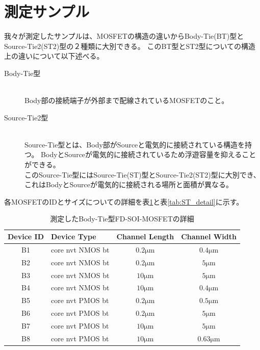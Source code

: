 	\section{測定サンプル}
		我々が測定したサンプルは、MOSFETの構造の違いからBody-Tie(BT)型とSource-Tie2(ST2)型の２種類に大別できる。
		このBT型とST2型についての構造上の違いについて以下述べる。
		\begin{description}
			\item[Body-Tie型]\mbox{}\\
				Body部の接続端子が外部まで配線されているMOSFETのこと。
			\item[Source-Tie2型]\mbox{}\\
				Source-Tie型とは、Body部がSourceと電気的に接続されている構造を持つ。
				BodyとSourceが電気的に接続されているため浮遊容量を抑えることができる。\\
				このSource-Tie型にはSource-Tie(ST)型とSource-Tie2(ST2)型に大別でき、これはBodyとSourceが電気的に接続される場所と面積が異なる。
		\end{description}
		各MOSFETのIDとサイズについての詳細を表\ref{tab:BT_detail}と表\ref{tab:ST_detail}に示す。
		\begin{table}[htb]
			\begin{center}
				\begin{tabular}{| c | l | c | c |} \hline
					Device ID & Device Type & Channel Length & Channel Width \\ \hline \hline
					B1 & core nvt NMOS bt & $0.2 \mathrm{\mu m}$ & $0.4 \mathrm{\mu m}$ \\ \hline
					B2 & core nvt NMOS bt & $0.2 \mathrm{\mu m}$ & $5 \mathrm{\mu m}$ \\ \hline
					B3 & core nvt NMOS bt & $10 \mathrm{\mu m}$ & $5 \mathrm{\mu m}$ \\ \hline
					B4 & core nvt NMOS bt & $10 \mathrm{\mu m}$ & $0.4 \mathrm{\mu m}$ \\ \hline \hline
					B5 & core nvt PMOS bt & $0.2 \mathrm{\mu m}$ & $0.5 \mathrm{\mu m}$ \\ \hline
					B6 & core nvt PMOS bt & $0.2 \mathrm{\mu m}$ & $5 \mathrm{\mu m}$ \\ \hline
					B7 & core nvt PMOS bt & $10 \mathrm{\mu m}$ & $5 \mathrm{\mu m}$ \\ \hline
					B8 & core nvt PMOS bt & $10 \mathrm{\mu m}$ & $0.63 \mathrm{\mu m}$ \\ \hline
				\end{tabular}
				\caption{測定したBody-Tie型FD-SOI-MOSFETの詳細}
				\label{tab:BT_detail}
			\end{center}
		\end{table}
		
